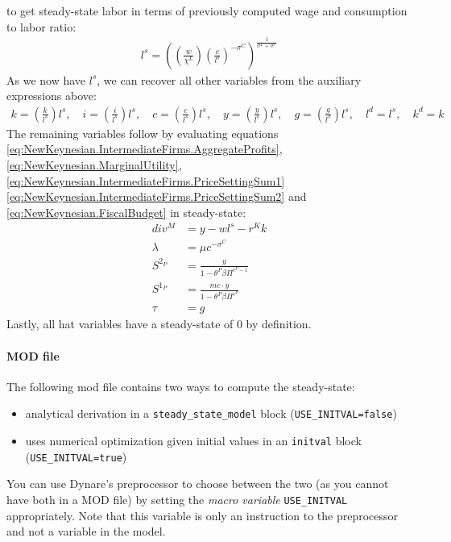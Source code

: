   to get steady-state labor in terms of previously computed wage and consumption to labor ratio:
\begin{align*}
l^{s} = {\left( \left(\frac{w}{\chi^{L}}\right) {\left(\frac{c}{l^{s}}\right)}^{-\sigma^{C}} \right)}^{\frac{1}{\sigma^{L}+\sigma^{C}}}
\end{align*}
As we now have \(l^{s}\), we can recover all other variables from the auxiliary expressions above:
\begin{align*}
k = \left(\frac{k}{l^{s}}\right) l^{s}
,\quad
i = \left(\frac{i}{l^{s}}\right) l^{s}
,\quad
c = \left(\frac{c}{l^{s}}\right) l^{s}
,\quad
y = \left(\frac{y}{l^{s}}\right) l^{s}
,\quad
g = \left(\frac{g}{l^{s}}\right) l^{s}
,\quad
l^{d} = l^{s}
,\quad
k^{d} = k
\end{align*}
The remaining variables follow by evaluating equations {\eqref{eq:NewKeynesian.IntermediateFirms.AggregateProfits}},
{\eqref{eq:NewKeynesian.MarginalUtility}},
{\eqref{eq:NewKeynesian.IntermediateFirms.PriceSettingSum1}}
{\eqref{eq:NewKeynesian.IntermediateFirms.PriceSettingSum2}}
and {\eqref{eq:NewKeynesian.FiscalBudget}} in steady-state:
\begin{align*}
div^{M} &= y - w l^{s} - r^{K} k
\\
\lambda &= \mu c^{-\sigma^{C}}
\\
S^{2_{P}} &= \frac{y}{1- \theta^{P} \beta \Pi^{\epsilon^{P}-1}}
\\
S^{1_{P}} &= \frac{{mc} \cdot y}{1- \theta^{P} \beta \Pi^{\epsilon^{P}}}
\\
\tau &= g
\end{align*}
Lastly, all hat variables have a steady-state of 0 by definition.

\paragraph{MOD file} The following mod file contains two ways to compute the steady-state:
\begin{itemize}
  \item analytical derivation in a \texttt{steady\_state\_model} block (\texttt{USE{\_}INITVAL=false})
  \item uses numerical optimization given initial values in an \texttt{initval} block (\texttt{USE{\_}INITVAL=true})
\end{itemize}
You can use Dynare's preprocessor to choose between the two (as you cannot have both in a MOD file)
  by setting the \emph{macro variable} \texttt{USE{\_}INITVAL} appropriately.
Note that this variable is only an instruction to the preprocessor and not a variable in the model.

